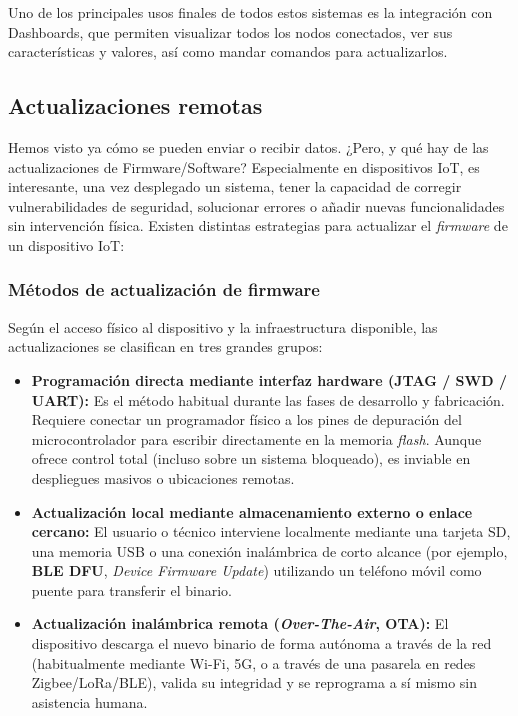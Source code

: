 \documentclass[../main.tex]{subfiles}
\begin{document}
                Uno de los principales usos finales de todos estos sistemas es la integración con Dashboards, que permiten visualizar todos los nodos conectados, ver sus características y valores, así como mandar comandos para actualizarlos.

        \subsection{Actualizaciones remotas}
            Hemos visto ya cómo se pueden enviar o recibir datos. ¿Pero, y qué hay de las actualizaciones de Firmware/Software? Especialmente en dispositivos IoT, es interesante, una vez desplegado un sistema, tener la capacidad de corregir vulnerabilidades de seguridad, solucionar errores o añadir nuevas funcionalidades sin intervención física. Existen distintas estrategias para actualizar el \emph{firmware} de un dispositivo IoT:

            \subsubsection{Métodos de actualización de firmware}
                Según el acceso físico al dispositivo y la infraestructura disponible, las actualizaciones se clasifican en tres grandes grupos:

                \begin{itemize}
                    \item \textbf{Programación directa mediante interfaz hardware (JTAG / SWD / UART):} Es el método habitual durante las fases de desarrollo y fabricación. Requiere conectar un programador físico a los pines de depuración del microcontrolador para escribir directamente en la memoria \emph{flash}. Aunque ofrece control total (incluso sobre un sistema bloqueado), es inviable en despliegues masivos o ubicaciones remotas.
                    \item \textbf{Actualización local mediante almacenamiento externo o enlace cercano:} El usuario o técnico interviene localmente mediante una tarjeta SD, una memoria USB o una conexión inalámbrica de corto alcance (por ejemplo, \textbf{BLE DFU}, \emph{Device Firmware Update}) utilizando un teléfono móvil como puente para transferir el binario.
                    \item \textbf{Actualización inalámbrica remota (\emph{Over-The-Air}, OTA):} El dispositivo descarga el nuevo binario de forma autónoma a través de la red (habitualmente mediante Wi-Fi, 5G, o a través de una pasarela en redes Zigbee/LoRa/BLE), valida su integridad y se reprograma a sí mismo sin asistencia humana.
                \end{itemize}
\end{document}
